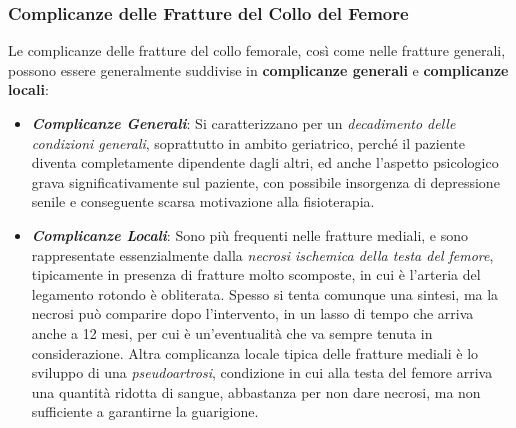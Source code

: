\subsubsection{Complicanze delle Fratture del Collo del Femore}

Le complicanze delle fratture del collo femorale, così come nelle
fratture generali, possono essere generalmente suddivise in
\textbf{complicanze generali} e \textbf{complicanze locali}:

\begin{itemize}
\item
  \textbf{\emph{Complicanze Generali}}: Si caratterizzano per un
  \emph{decadimento delle condizioni generali}, soprattutto in ambito
  geriatrico, perché il paziente diventa completamente dipendente dagli
  altri, ed anche l'aspetto psicologico grava significativamente sul
  paziente, con possibile insorgenza di depressione senile e conseguente
  scarsa motivazione alla fisioterapia.
\item
  \textbf{\emph{Complicanze Locali}}: Sono più frequenti nelle fratture
  mediali, e sono rappresentate essenzialmente dalla \emph{necrosi
  ischemica della testa del femore}, tipicamente in presenza di fratture
  molto scomposte, in cui è l'arteria del legamento rotondo è
  obliterata. Spesso si tenta comunque una sintesi, ma la necrosi può
  comparire dopo l'intervento, in un lasso di tempo che arriva anche a
  12 mesi, per cui è un'eventualità che va sempre tenuta in
  considerazione. Altra complicanza locale tipica delle fratture mediali
  è lo sviluppo di una \emph{pseudoartrosi}, condizione in cui alla
  testa del femore arriva una quantità ridotta di sangue, abbastanza per
  non dare necrosi, ma non sufficiente a garantirne la guarigione.
\end{itemize}

